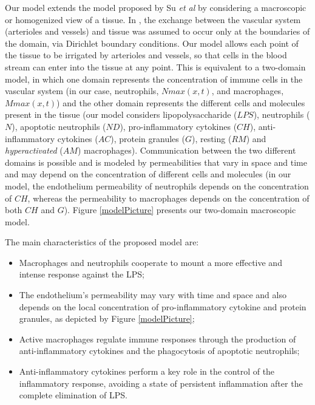 \documentclass[10pt]{bmc_article}
\newenvironment{bmcformat}{\baselineskip20pt\sloppy\setboolean{publ}{false}}{\baselineskip20pt\sloppy}
\begin{document}
\begin{bmcformat}
Our model extends the model proposed by Su \textit{et al} \cite{localmodel} by considering a macroscopic or homogenized view of a 
tissue. In \cite{localmodel}, the exchange between the vascular system (arterioles and vessels) and tissue was assumed to occur 
only at the boundaries of the domain, via Dirichlet boundary conditions. Our model allows each point of the tissue to be irrigated 
by arterioles and vessels, so that cells in the blood stream can enter into the tissue at any point. This is equivalent to a 
two-domain model, in which one domain represents the concentration of immune cells in the vascular system (in our case, neutrophils, 
$Nmax(x,t)$, and macrophages, $Mmax(x,t)$) and the other domain represents the different cells and molecules present in the tissue 
(our model considers lipopolysaccharide ($LPS$), neutrophils ($N$), apoptotic neutrophils ($ND$), pro-inflammatory cytokines ($CH$), 
anti-inflammatory cytokines ($AC$), protein granules ($G$), resting ($RM$) and \textit{hyperactivated} ($AM$) macrophages).
Communication between the two different domains is possible and is modeled by permeabilities that vary in space and time and may 
depend on the concentration of different cells and molecules (in our model, the endothelium permeability of neutrophils depends on 
the concentration of $CH$, whereas the permeability to macrophages depends on the concentration of both $CH$ and $G$). Figure 
\ref{modelPicture} presents our two-domain macroscopic model.


The main characteristics of the proposed model are: 
\begin{itemize}
\item Macrophages and neutrophils cooperate to mount a more effective and intense response against the LPS; 
\item The endothelium's permeability may vary with time and space and also depends on the local concentration of pro-inflammatory 
cytokine and protein granules, as depicted by Figure \ref{modelPicture}; 
\item Active macrophages regulate immune responses through the production of anti-inflammatory cytokines and the phagocytosis of 
apoptotic neutrophils; 
\item Anti-inflammatory cytokines perform a key role in the control of the inflammatory response, avoiding a state of persistent 
inflammation after the complete elimination of LPS. 
\end{itemize}


\end{bmcformat}
\end{document}
